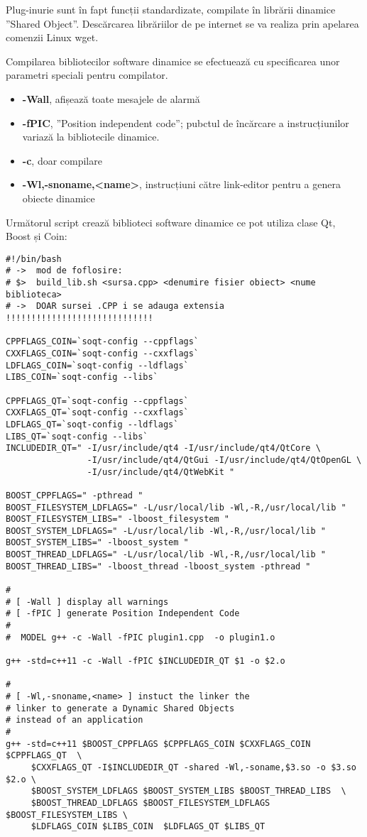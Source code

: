 \par Plug-inurie sunt în fapt funcții standardizate, compilate în librării dinamice ”Shared Object”. Descărcarea librăriilor de pe internet se va realiza prin apelarea comenzii Linux wget. 
\par Compilarea bibliotecilor software dinamice se efectuează cu specificarea unor parametri speciali pentru compilator.
\begin{itemize}
\item \textbf{-Wall}, afișează toate mesajele de alarmă
\item \textbf{-fPIC}, ”Position independent code”; pubctul de încărcare a instrucțiunilor variază la bibliotecile dinamice. 
\item \textbf{-c}, doar compilare 
\item \textbf{-Wl,-snoname,<name>}, instrucțiuni către link-editor pentru a genera obiecte dinamice
\end{itemize}
Următorul script crează biblioteci software dinamice ce pot utiliza clase Qt, Boost și Coin:
\begin{verbatim}
#!/bin/bash
# ->  mod de foflosire: 
# $>  build_lib.sh <sursa.cpp> <denumire fisier obiect> <nume biblioteca>
# ->  DOAR sursei .CPP i se adauga extensia !!!!!!!!!!!!!!!!!!!!!!!!!!!!! 

CPPFLAGS_COIN=`soqt-config --cppflags`
CXXFLAGS_COIN=`soqt-config --cxxflags`
LDFLAGS_COIN=`soqt-config --ldflags`
LIBS_COIN=`soqt-config --libs`

CPPFLAGS_QT=`soqt-config --cppflags`
CXXFLAGS_QT=`soqt-config --cxxflags`
LDFLAGS_QT=`soqt-config --ldflags`
LIBS_QT=`soqt-config --libs`
INCLUDEDIR_QT=" -I/usr/include/qt4 -I/usr/include/qt4/QtCore \
                -I/usr/include/qt4/QtGui -I/usr/include/qt4/QtOpenGL \
                -I/usr/include/qt4/QtWebKit "

BOOST_CPPFLAGS=" -pthread " 
BOOST_FILESYSTEM_LDFLAGS=" -L/usr/local/lib -Wl,-R,/usr/local/lib "
BOOST_FILESYSTEM_LIBS=" -lboost_filesystem "
BOOST_SYSTEM_LDFLAGS=" -L/usr/local/lib -Wl,-R,/usr/local/lib "
BOOST_SYSTEM_LIBS=" -lboost_system "
BOOST_THREAD_LDFLAGS=" -L/usr/local/lib -Wl,-R,/usr/local/lib "
BOOST_THREAD_LIBS=" -lboost_thread -lboost_system -pthread "

#
# [ -Wall ] display all warnings
# [ -fPIC ] generate Position Independent Code
#
#  MODEL g++ -c -Wall -fPIC plugin1.cpp  -o plugin1.o

g++ -std=c++11 -c -Wall -fPIC $INCLUDEDIR_QT $1 -o $2.o 

#
# [ -Wl,-snoname,<name> ] instuct the linker the
# linker to generate a Dynamic Shared Objects
# instead of an application
#
g++ -std=c++11 $BOOST_CPPFLAGS $CPPFLAGS_COIN $CXXFLAGS_COIN $CPPFLAGS_QT  \
     $CXXFLAGS_QT -I$INCLUDEDIR_QT -shared -Wl,-soname,$3.so -o $3.so $2.o \
     $BOOST_SYSTEM_LDFLAGS $BOOST_SYSTEM_LIBS $BOOST_THREAD_LIBS  \
     $BOOST_THREAD_LDFLAGS $BOOST_FILESYSTEM_LDFLAGS $BOOST_FILESYSTEM_LIBS \
     $LDFLAGS_COIN $LIBS_COIN  $LDFLAGS_QT $LIBS_QT
	
\end{verbatim}
